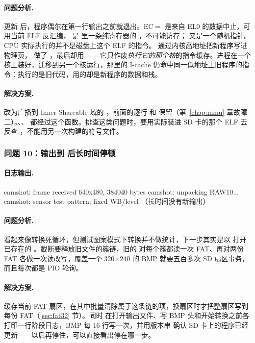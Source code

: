\paragraph{问题分析.} 更新  后，程序偶尔在第一行输出之前就退出。EC$=$ 是来自 EL0 的数据中止，可用当前 ELF 反汇编， 是  里一条纯寄存器的 ，不可能访存； 又是一个随机指针。CPU 实际执行的并不是磁盘上这个 ELF 的指令。 通过内核高地址把新程序写进物理页， 做了 ，最后却用 ——它只作废\emph{执行它的那个核}的指令缓存。进程在一个核上装好，迁移到另一个核运行，那里的 I-cache 仍命中同一低地址上旧程序的指令：执行的是旧代码，用的却是新程序的数据和栈。

\paragraph{解决方案.} 改为广播到 Inner Shareable 域的 ，前面的逐行  和  保留（第~\ref{chap:mmu} 章故障二）。、、 都经过这个函数。排查这类问题时，要用实际装进 SD 卡的那个 ELF 去反查 ，不能用另一次构建的符号文件。

\subsubsection{问题 10：输出到  后长时间停顿}

\paragraph{日志输出.}
\begin{txtcode}
camshot: frame received 640x480, 384040 bytes
camshot: unpacking RAW10...
camshot: sensor test pattern; fixed WB/level
（长时间没有新输出）
\end{txtcode}

\paragraph{问题分析.} 看起来像转换死循环，但测试图案模式下转换并不做统计，下一步其实是以  打开已存在的 。截断要释放旧文件的簇链，旧的  对每个簇都读一次 FAT、再对两份 FAT 各做一次读改写，覆盖一个 320$\times$240 的 BMP 就要五百多次 SD 扇区事务，而且每次都是 PIO 轮询。

\paragraph{解决方案.}  缓存当前 FAT 扇区，在其中批量清除属于这条链的项，换扇区时才把整扇区写到每份 FAT（\ref{sec:fat32} 节）。同时  在打开输出文件、写 BMP 头和开始转换之前各打印一行阶段日志，BMP 每 16 行写一次，并用版本串  确认 SD 卡上的程序已经更新——以后再停住，可以直接看出停在哪一步。

